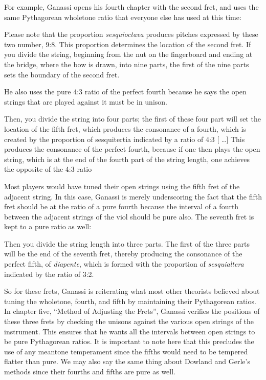 For example, Ganassi opens his fourth chapter with the second fret, and uses the same
Pythagorean wholetone ratio that everyone else has used at this time:
\begin{blocks}
Please note that the proportion \emph{sesquioctava} produces pitches expressed
by these two number, 9:8. This proportion determines the location of the second
fret. If you divide the string, beginning from the nut on the fingerboard and
ending at the bridge, where the bow is drawn, into nine parts, the first of the
nine parts sets the boundary of the second fret.
\end{blocks}
He also uses the pure 4:3 ratio of the
perfect fourth because he says the open strings that are played against it must
be in unison.
\begin{blocks}
Then, you divide the string into four parts; the first of these four part will
set the location of the fifth fret, which produces the consonance of a fourth,
which is created by the proportion of sesquitertia indicated by a ratio of 4:3
[ \ldots ] This produces the consonance of the perfect fourth, because if
one then plays the open string, which is at the end of the fourth part of the
string length, one achieves the opposite of the 4:3 ratio
\end{blocks}
Most players would have tuned their open strings using the fifth fret of the
adjacent string. In this case, Ganassi is merely underscoring the fact that the fifth
fret should be at the ratio of a pure fourth because the interval of a fourth between
the adjacent strings of the viol should be pure also. The seventh fret is kept to a pure
ratio as well:
\begin{blocks}
Then you divide the string length into three parts. The first of the three parts will
be the end of the seventh fret, thereby producing the consonance of the perfect fifth,
of \textit{diapente}, which is formed with the proportion of \textit{sesquialtera}
indicated by the ratio of 3:2.
\end{blocks}

So for these frets, Ganassi is reiterating what most other theorists believed about tuning the wholetone, fourth, and
fifth by maintaining their Pythagorean ratios. In chapter five, ``Method of Adjusting the Frets'', Ganassi verifies the
positions of these three frets by checking the unisons against the various open strings of the instrument. This ensures
that he wants all the intervals between open strings to be pure Pythagorean ratios. It is important to note here that
this precludes the use of any meantone temperament since the fifths would need to be tempered flatter than pure. We may
also say the same thing about Dowland and Gerle's methods since their fourths and fifths are pure as well.

